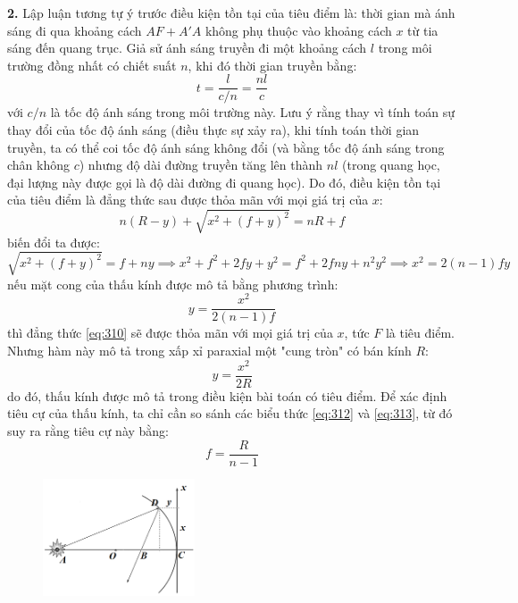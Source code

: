 \noindent\textbf{2.} Lập luận tương tự ý trước điều kiện tồn tại của tiêu điểm là: thời gian mà ánh sáng đi qua khoảng cách $AF + A'A$ không phụ thuộc vào khoảng cách $x$ từ tia sáng đến quang trục. Giả sử ánh sáng truyền đi một khoảng cách $ l $ trong môi trường đồng nhất có chiết suất $ n $, khi đó thời gian truyền bằng:
\begin{equation}
  \label{eq:39}
  t = \frac{l}{c/n} = \frac{nl}{c}
\end{equation}
với $c/n $ là tốc độ ánh sáng trong môi trường này. Lưu ý rằng thay vì tính toán sự thay đổi của tốc độ ánh sáng (điều thực sự xảy ra), khi tính toán thời gian truyền, ta có thể coi tốc độ ánh sáng không đổi (và bằng tốc độ ánh sáng trong chân không $ c $) nhưng độ dài đường truyền tăng lên thành $ nl $ (trong quang học, đại lượng này được gọi là độ dài đường đi quang học). Do đó, điều kiện tồn tại của tiêu điểm là đẳng thức sau được thỏa mãn với mọi giá trị của $ x $:
\begin{equation}
  \label{eq:310}
  n(R-y)+\sqrt{x^{2}+(f+y)^{2}}=nR+f
\end{equation}
biến đổi ta được:
\begin{equation}
  \label{eq:311}
  \sqrt{x^{2}+(f+y)^{2}}=f+ny\implies x^{2}+f^{2}+2fy+y^{2}=f^{2}+2fny+n^{2}y^{2}\implies x^{2}=2(n-1)fy
\end{equation}
nếu mặt cong của thấu kính được mô tả bằng phương trình:
\begin{equation}
  \label{eq:312}
  y = \frac{x^{2}}{2(n - 1)f}
\end{equation}
thì đẳng thức \eqref{eq:310} sẽ được thỏa mãn với mọi giá trị của $ x $, tức $ F $ là tiêu điểm. Nhưng hàm này mô tả trong xấp xỉ paraxial một "cung tròn" có bán kính $ R $:
\begin{equation}
  \label{eq:313}
  y = \frac{x^{2}}{2R}
\end{equation}
do đó, thấu kính được mô tả trong điều kiện bài toán có tiêu điểm. Để xác định tiêu cự của thấu kính, ta chỉ cần so sánh các biểu thức \eqref{eq:312} và \eqref{eq:313}, từ đó suy ra rằng tiêu cự này bằng:
\begin{equation}
  \label{eq:314}
  f = \frac{R}{n-1}
\end{equation}

\begin{figure}
  \centering
  \vspace{-8mm}
  \includegraphics[width=0.4\textwidth]{Figures/P3/Fig 3.3S.png}
\end{figure}

